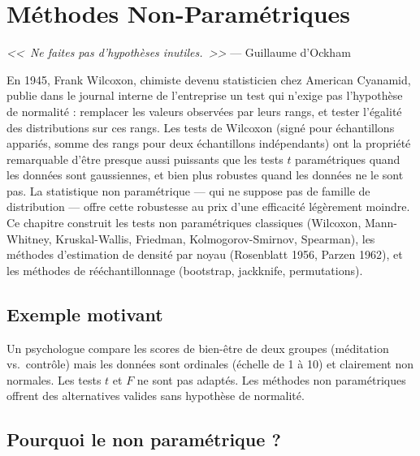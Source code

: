 \chapter{M\'ethodes Non-Param\'etriques}
\label{ch:nonparam}

\begin{center}
\textit{<<~Ne faites pas d'hypoth\`eses inutiles.~>>} --- Guillaume d'Ockham
\end{center}

En 1945, Frank Wilcoxon, chimiste devenu statisticien chez American Cyanamid, publie dans le journal interne de l'entreprise un test qui n'exige pas l'hypothèse de normalité : remplacer les valeurs observées par leurs rangs, et tester l'égalité des distributions sur ces rangs. Les tests de Wilcoxon (signé pour échantillons appariés, somme des rangs pour deux échantillons indépendants) ont la propriété remarquable d'être presque aussi puissants que les tests $t$ paramétriques quand les données sont gaussiennes, et bien plus robustes quand les données ne le sont pas. La statistique non paramétrique --- qui ne suppose pas de famille de distribution --- offre cette robustesse au prix d'une efficacité légèrement moindre. Ce chapitre construit les tests non paramétriques classiques (Wilcoxon, Mann-Whitney, Kruskal-Wallis, Friedman, Kolmogorov-Smirnov, Spearman), les méthodes d'estimation de densité par noyau (Rosenblatt 1956, Parzen 1962), et les méthodes de rééchantillonnage (bootstrap, jackknife, permutations).

\section{Exemple motivant}

Un psychologue compare les scores de bien-\^etre de deux groupes (m\'editation vs.\ contr\^ole) mais les donn\'ees sont ordinales (\'echelle de 1 \`a 10) et clairement non normales. Les tests $t$ et $F$ ne sont pas adapt\'es. Les m\'ethodes non param\'etriques offrent des alternatives valides sans hypoth\`ese de normalit\'e.

\section{Pourquoi le non param\'etrique ?}


